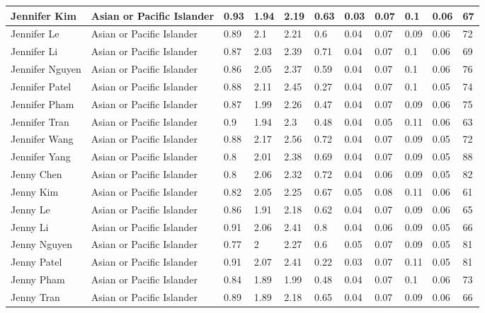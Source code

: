 \begin{table}[!ht]
\begin{tabular}{|l|l|l|l|l|l|l|l|l|l|l|}
        Jennifer Kim & Asian or Pacific Islander & 0.93 & 1.94 & 2.19 & 0.63 & 0.03 & 0.07 & 0.1 & 0.06 & 67 \\ \hline
        Jennifer Le & Asian or Pacific Islander & 0.89 & 2.1 & 2.21 & 0.6 & 0.04 & 0.07 & 0.09 & 0.06 & 72 \\ \hline
        Jennifer Li & Asian or Pacific Islander & 0.87 & 2.03 & 2.39 & 0.71 & 0.04 & 0.07 & 0.1 & 0.06 & 69 \\ \hline
        Jennifer Nguyen & Asian or Pacific Islander & 0.86 & 2.05 & 2.37 & 0.59 & 0.04 & 0.07 & 0.1 & 0.06 & 76 \\ \hline
        Jennifer Patel & Asian or Pacific Islander & 0.88 & 2.11 & 2.45 & 0.27 & 0.04 & 0.07 & 0.1 & 0.05 & 74 \\ \hline
        Jennifer Pham & Asian or Pacific Islander & 0.87 & 1.99 & 2.26 & 0.47 & 0.04 & 0.07 & 0.09 & 0.06 & 75 \\ \hline
        Jennifer Tran & Asian or Pacific Islander & 0.9 & 1.94 & 2.3 & 0.48 & 0.04 & 0.05 & 0.11 & 0.06 & 63 \\ \hline
        Jennifer Wang & Asian or Pacific Islander & 0.88 & 2.17 & 2.56 & 0.72 & 0.04 & 0.07 & 0.09 & 0.05 & 72 \\ \hline
        Jennifer Yang & Asian or Pacific Islander & 0.8 & 2.01 & 2.38 & 0.69 & 0.04 & 0.07 & 0.09 & 0.05 & 88 \\ \hline
        Jenny Chen & Asian or Pacific Islander & 0.8 & 2.06 & 2.32 & 0.72 & 0.04 & 0.06 & 0.09 & 0.05 & 82 \\ \hline
        Jenny Kim & Asian or Pacific Islander & 0.82 & 2.05 & 2.25 & 0.67 & 0.05 & 0.08 & 0.11 & 0.06 & 61 \\ \hline
        Jenny Le & Asian or Pacific Islander & 0.86 & 1.91 & 2.18 & 0.62 & 0.04 & 0.07 & 0.09 & 0.06 & 65 \\ \hline
        Jenny Li & Asian or Pacific Islander & 0.91 & 2.06 & 2.41 & 0.8 & 0.04 & 0.06 & 0.09 & 0.05 & 66 \\ \hline
        Jenny Nguyen & Asian or Pacific Islander & 0.77 & 2 & 2.27 & 0.6 & 0.05 & 0.07 & 0.09 & 0.05 & 81 \\ \hline
        Jenny Patel & Asian or Pacific Islander & 0.91 & 2.07 & 2.41 & 0.22 & 0.03 & 0.07 & 0.11 & 0.05 & 81 \\ \hline
        Jenny Pham & Asian or Pacific Islander & 0.84 & 1.89 & 1.99 & 0.48 & 0.04 & 0.07 & 0.1 & 0.06 & 73 \\ \hline
        Jenny Tran & Asian or Pacific Islander & 0.89 & 1.89 & 2.18 & 0.65 & 0.04 & 0.07 & 0.09 & 0.06 & 66 \\ \hline

\end{tabular}
\end{table}
